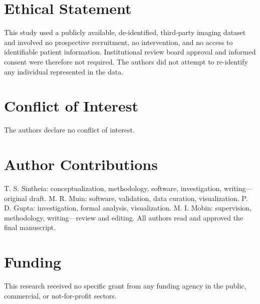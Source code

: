 \documentclass[journal]{IEEEtran}
\begin{document}
\section*{Ethical Statement}
This study used a publicly available, de-identified, third-party imaging dataset
\cite{gobara2024multiclass} and involved no prospective recruitment, no
intervention, and no access to identifiable patient information. Institutional
review board approval and informed consent were therefore not required. The
authors did not attempt to re-identify any individual represented in the data.

\section*{Conflict of Interest}
The authors declare no conflict of interest.

\section*{Author Contributions}
T. S. Sintheia: conceptualization, methodology, software, investigation,
writing---original draft. M. R. Muin: software, validation, data curation,
visualization. P. D. Gupta: investigation, formal analysis, visualization.
M. I. Mobin: supervision, methodology, writing---review and editing. All authors
read and approved the final manuscript.

\section*{Funding}
This research received no specific grant from any funding agency in the public,
commercial, or not-for-profit sectors.



\end{document}
